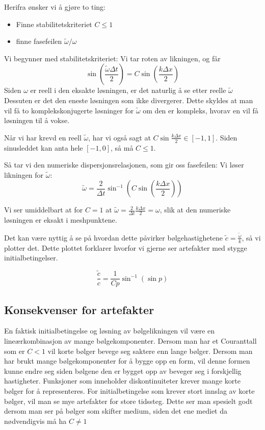 \documentclass[a4paper, 10pt]{article}
\begin{document}
Herifra ønsker vi å gjøre to ting:
\begin{itemize}
\item Finne stabilitetskriteriet $C\leq 1$
\item finne fasefeilen $\tilde{\omega}/\omega$
\end{itemize}

Vi begynner med stabilitetskriteriet:
Vi tar roten av likningen, og får 
\begin{equation}
	\sin\left(\frac{\tilde\omega\Delta t}{2}\right)
= C\sin\left(\frac{k\Delta x}{2}\right)
\end{equation}
Siden $\omega$ er reell i den eksakte løsningen, er det naturlig å se etter reelle $\tilde{\omega}$ Dessuten er det den eneste løsningen som ikke divergerer. Dette skyldes at man vil få to komplekskonjugerte løsninger for $\tilde{\omega}$ om den er kompleks, hvorav en vil få løsningen til å vokse. 

Når vi har krevd en reell $\tilde{\omega}$, har vi også sagt at $C\sin{\frac{k\Delta x}{2}} \in [-1, 1]$. Siden sinusleddet kan anta hele $[-1, 0]$, så må $C\leq 1$.

Så tar vi den numeriske dispersjonsrelasjonen, som gir oss fasefeilen:
Vi løser likningen for $\tilde{\omega}$:
\begin{equation}
	\tilde\omega = \frac{2}{\Delta t}
\sin^{-1}\left( C\sin\left(\frac{k\Delta x}{2}\right)\right)
\end{equation}

Vi ser umiddelbart at for $C=1$ at $\tilde{\omega} = \frac{2}{\Delta t}\frac{k\Delta x}{2} = \omega$, slik at den numeriske løsningen er eksakt i meshpunktene. 

Det kan være nyttig å se på hvordan dette påvirker bølgehastighetene $\tilde{c} = \frac{\tilde\omega}{k}$, så vi plotter det. Dette plottet forklarer hvorfor vi gjerne ser artefakter med stygge initialbetingelser.

\begin{equation}
	\frac{\tilde{c}}{c} = \frac{1}{C p} \sin^{-1}(\sin p)
\end{equation}

\subsection{Konsekvenser for artefakter}
En faktisk initialbetingelse og løsning av bølgelikningen vil være en lineærkombinasjon av mange bølgekomponenter. Dersom man har et Couranttall som er $C<1$ vil korte bølger bevege seg saktere enn lange bølger. Dersom man har brukt mange bølgekomponenter for å bygge opp en form, vil denne formen kunne endre seg siden bølgene den er bygget opp av beveger seg i forskjellig hastigheter. Funksjoner som inneholder diskontinuiteter krever mange korte bølger for å representeres. For initialbetingelse som krever stort innslag av korte bølger, vil man se mye artefakter for store tidssteg. Dette ser man spesielt godt dersom man ser på bølger som skifter medium, siden det ene mediet da nødvendigvis må ha $C \neq 1$
\end{document}
